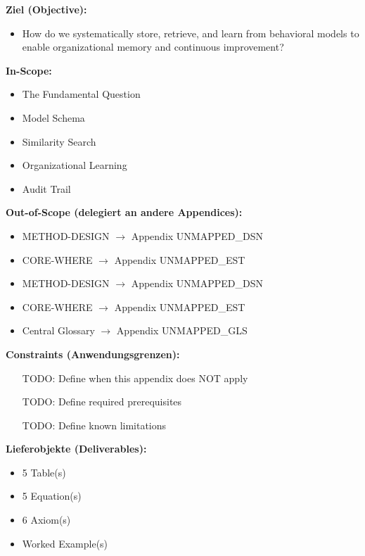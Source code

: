 \begin{tcolorbox}[
    colback=orange!5!white,
    colframe=orange!75!black,
    title={\textbf{Appendix Scope: Ziel / In-Scope / Out-of-Scope / Constraints}},
    fonttitle=\bfseries
]

\textbf{Ziel (Objective):}
\begin{itemize}[nosep]
    \item How do we systematically store, retrieve, and learn from behavioral
models to enable organizational memory and continuous improvement?
\end{itemize}

\textbf{In-Scope:}
\begin{itemize}[nosep]
    \item The Fundamental Question
    \item Model Schema
    \item Similarity Search
    \item Organizational Learning
    \item Audit Trail
\end{itemize}

\textbf{Out-of-Scope (delegiert an andere Appendices):}
\begin{itemize}[nosep]
    \item METHOD-DESIGN $\rightarrow$ Appendix UNMAPPED_DSN
    \item CORE-WHERE $\rightarrow$ Appendix UNMAPPED_EST
    \item METHOD-DESIGN $\rightarrow$ Appendix UNMAPPED_DSN
    \item CORE-WHERE $\rightarrow$ Appendix UNMAPPED_EST
    \item Central Glossary $\rightarrow$ Appendix UNMAPPED_GLS
\end{itemize}

\textbf{Constraints (Anwendungsgrenzen):}
\begin{itemize}[nosep]
    \item [TODO: Define when this appendix does NOT apply]
    \item [TODO: Define required prerequisites]
    \item [TODO: Define known limitations]
\end{itemize}

\textbf{Lieferobjekte (Deliverables):}
\begin{itemize}[nosep]
    \item 5 Table(s)
    \item 5 Equation(s)
    \item 6 Axiom(s)
    \item Worked Example(s)
\end{itemize}

\end{tcolorbox}




